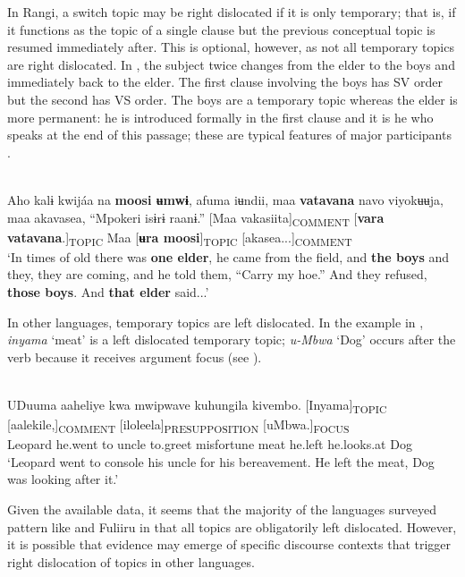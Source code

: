 \documentclass[output=paper]{langsci/langscibook}
\begin{document}
In Rangi, a switch topic may be right dislocated if it is only temporary; that is, if it functions as the topic of a single clause but the previous conceptual topic is resumed immediately after. This is optional, however, as not all temporary topics are right dislocated. In , the subject twice changes from the elder to the boys and immediately back to the elder. The first clause involving the boys has SV order but the second has VS order. The boys are a temporary topic whereas the elder is more permanent: he is introduced formally in the first clause and it is he who speaks at the end of this passage; these are typical features of major participants \citep[119]{dooleylevinsohn2001}.

\ea\label{ex:14.nicolle}
\\
Aho kalɨ kwijáa na \textbf{moosi ʉmwɨ}, afuma iʉndii, maa \textbf{vatavana} navo viyokʉʉja, maa akavasea, “Mpokeri isɨrɨ raanɨ.” [Maa vakasiita]\textsubscript{COMMENT} [\textbf{vara vatavana}.]\textsubscript{TOPIC} Maa [\textbf{ʉra moosi}]\textsubscript{TOPIC} [akasea...]\textsubscript{COMMENT}\\
\glt ‘In times of old there was \textbf{one elder}, he came from the field, and \textbf{the boys} and they, they are coming, and he told them, “Carry my hoe.” And they refused, \textbf{those boys}. And \textbf{that elder} said...’
\z

In other languages, temporary topics are left dislocated. In the  example in ,  \textit{inyama} ‘meat’ is a left dislocated temporary topic; \textit{u}\textit{-Mbwa} ‘Dog’ occurs after the verb because it receives argument focus (see ).

\ea\label{ex:15.nicolle}
\\
\gll UDuuma aaheliye kwa mwipwave kuhungila kivembo. [Inyama]\textsubscript{TOPIC} [aalekile,]\textsubscript{COMMENT} [iloleela]\textsubscript{PRESUPPOSITION} [uMbwa.]\textsubscript{FOCUS} \\
Leopard he.went to uncle to.greet misfortune {\db}meat {\db}he.left {\db}he.looks.at {\db}Dog\\
\glt ‘Leopard went to console his uncle for his bereavement. He left the meat, Dog was looking after it.’
\z

Given the available data, it seems that the majority of the languages surveyed pattern like  and Fuliiru in that all topics are obligatorily left dislocated. However, it is possible that evidence may emerge of specific discourse contexts that trigger right dislocation of topics in other languages.
\end{document}
